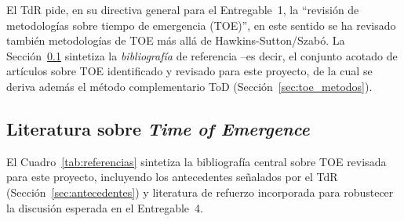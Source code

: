\documentclass[11pt,a4paper]{article}
\begin{document}
El TdR pide, en su directiva general para el Entregable~1, la ``revisi\'on de metodolog\'ias sobre tiempo de emergencia (TOE)'', en este sentido se ha revisado tambi\'en metodolog\'ias de TOE m\'as all\'a de Hawkins-Sutton/Szab\'o. 
La Secci\'on~\ref{sec:referencias} sintetiza la \emph{bibliograf\'ia} de referencia --es decir, el conjunto acotado de art\'iculos sobre TOE identificado y revisado para este proyecto, de la cual se deriva adem\'as el m\'etodo complementario ToD (Secci\'on~\ref{sec:toe_metodos}).

\subsection{Literatura sobre \emph{Time of Emergence}}
\label{sec:referencias}

El Cuadro~\ref{tab:referencias} sintetiza la bibliograf\'ia central sobre TOE revisada para este proyecto, incluyendo los antecedentes señalados por el TdR (Secci\'on~\ref{sec:antecedentes}) y literatura de refuerzo incorporada para robustecer la discusi\'on esperada en el Entregable~4.
\end{document}
